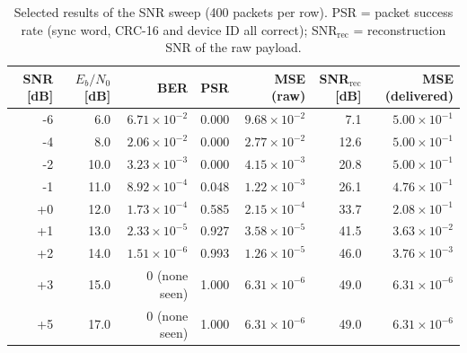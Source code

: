 \documentclass[11pt,a4paper]{article}
\newcommand{\EbNo}{E_b/N_0}
\begin{document}
\begin{table}[H]\centering\small
\caption{Selected results of the SNR sweep (400 packets per row). PSR = packet success rate (sync word, CRC-16 and device ID all correct); SNR$_{\text{rec}}$ = reconstruction SNR of the raw payload.}\label{tab:sweep}
\begin{tabular}{@{}rrrrrrr@{}}\toprule
SNR [dB] & $\EbNo$ [dB] & BER & PSR & MSE (raw) & SNR$_{\text{rec}}$ [dB] & MSE (delivered)\\\midrule
-6 & 6.0 & $6.71\times10^{-2}$ & 0.000 & $9.68\times10^{-2}$ & 7.1 & $5.00\times10^{-1}$ \\
-4 & 8.0 & $2.06\times10^{-2}$ & 0.000 & $2.77\times10^{-2}$ & 12.6 & $5.00\times10^{-1}$ \\
-2 & 10.0 & $3.23\times10^{-3}$ & 0.000 & $4.15\times10^{-3}$ & 20.8 & $5.00\times10^{-1}$ \\
-1 & 11.0 & $8.92\times10^{-4}$ & 0.048 & $1.22\times10^{-3}$ & 26.1 & $4.76\times10^{-1}$ \\
+0 & 12.0 & $1.73\times10^{-4}$ & 0.585 & $2.15\times10^{-4}$ & 33.7 & $2.08\times10^{-1}$ \\
+1 & 13.0 & $2.33\times10^{-5}$ & 0.927 & $3.58\times10^{-5}$ & 41.5 & $3.63\times10^{-2}$ \\
+2 & 14.0 & $1.51\times10^{-6}$ & 0.993 & $1.26\times10^{-5}$ & 46.0 & $3.76\times10^{-3}$ \\
+3 & 15.0 & $0$ (none seen) & 1.000 & $6.31\times10^{-6}$ & 49.0 & $6.31\times10^{-6}$ \\
+5 & 17.0 & $0$ (none seen) & 1.000 & $6.31\times10^{-6}$ & 49.0 & $6.31\times10^{-6}$ \\
\bottomrule\end{tabular}
\end{table}
\end{document}
